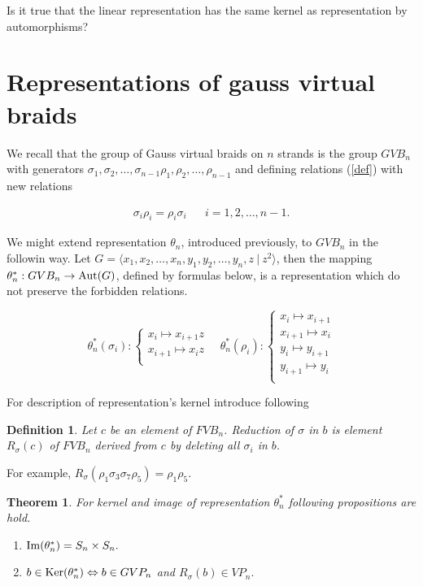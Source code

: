 \documentclass{article}
\newtheorem{theorem}{Theorem}
\newtheorem{definition}{Definition}
\begin{document}
Is it true that the linear representation has the same kernel as representation by automorphisms?

\section{Representations of gauss virtual braids}

We recall that the group of Gauss virtual braids on $n$ strands is the group $GVB_n$ with generators  $\sigma _1,\sigma _2,\dots,\sigma _{n-1}\rho_1,\rho _2,\dots,\rho _{n-1}$ and defining relations (\ref{def}) with new relations 

\begin{align*}
\sigma_i\rho_i=\rho_i\sigma_i && i = 1, 2, \dots,n-1.
\end{align*}

We might extend representation $\theta_n$, introduced previously, to $GVB_n$ in the followin way. Let $G=\langle x_1, x_2, \ldots, x_n, y_1, y_2, \ldots, y_n, z ~|~ z^2\rangle$, then the mapping $\theta_n^*:GVB_n\to {\rm Aut}(G)$, defined by formulas below, is a representation which do not preserve the forbidden relations. 

\begin{equation}\label{defGV}
\theta_n^*(\sigma_i):
\begin{cases}
x_i \mapsto x_{i+1}z\\
x_{i+1} \mapsto x_iz\\
\end{cases}\quad
\theta_n^*(\rho_i):
\begin{cases}
x_i \mapsto x_{i+1}\\
x_{i+1} \mapsto x_i\\
y_i \mapsto y_{i+1}\\
y_{i+1} \mapsto y_i\\
\end{cases}
\end{equation}

For description of representation's kernel introduce following

\begin{definition}
Let $c$ be an element of $FVB_n$. Reduction of $\sigma$ in $b$ is element $R_{\sigma}(c)$ of $FVB_n$ derived from $c$ by deleting all $\sigma_i$ in $b$.
\end{definition}

For example, $R_{\sigma}(\rho_1\sigma_3\sigma_7\rho_5)=\rho_1\rho_5$. 

\begin{theorem}
For kernel and image of representation $\theta_n^*$ following propositions are hold.
\begin{enumerate}
\item ${\rm Im}(\theta_n^*)=S_n\times S_n.$
\item $b\in {\rm Ker}(\theta_n^*) \Leftrightarrow b\in GVP_n$ and $R_{\sigma}(b)\in VP_n.$
\end{enumerate}
\end{theorem}
\end{document}
